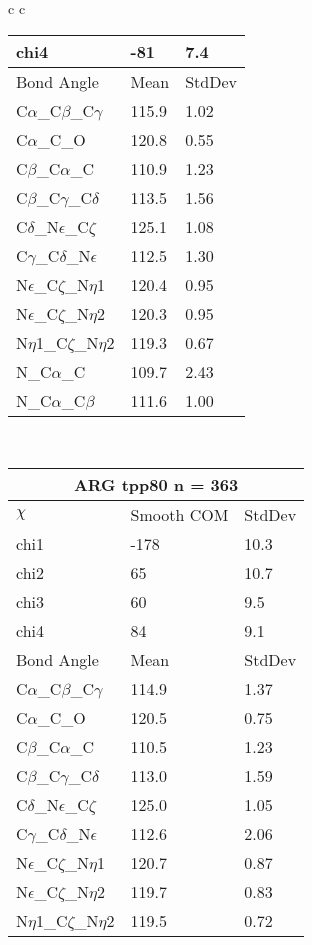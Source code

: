 \begin{longtable}{ c c }
\begin{tabular}{ l l l }
  chi4 & -81 & 7.4 \\ \midrule
  Bond Angle   & Mean     & StdDev \\ \midrule
  C$\alpha$\_C$\beta$\_C$\gamma$ & 115.9 & 1.02\\
  C$\alpha$\_C\_O & 120.8 & 0.55\\
  C$\beta$\_C$\alpha$\_C & 110.9 & 1.23\\
  C$\beta$\_C$\gamma$\_C$\delta$ & 113.5 & 1.56\\
  C$\delta$\_N$\epsilon$\_C$\zeta$ & 125.1 & 1.08\\
  C$\gamma$\_C$\delta$\_N$\epsilon$ & 112.5 & 1.30\\
  N$\epsilon$\_C$\zeta$\_N$\eta$1 & 120.4 & 0.95\\
  N$\epsilon$\_C$\zeta$\_N$\eta$2 & 120.3 & 0.95\\
  N$\eta$1\_C$\zeta$\_N$\eta$2 & 119.3 & 0.67\\
  N\_C$\alpha$\_C & 109.7 & 2.43\\
  N\_C$\alpha$\_C$\beta$ & 111.6 & 1.00\\
  \bottomrule
  \end{tabular}
  \\
  \begin{tabular}{ l l l }
  \toprule
  \multicolumn{3}{c}{ARG \textbf{tpp80} n = 363} \\ \toprule
  $\chi$       & Smooth COM & StdDev \\ \midrule
  chi1 & -178 & 10.3 \\ 
  chi2 & 65 & 10.7 \\ 
  chi3 & 60 & 9.5 \\ 
  chi4 & 84 & 9.1 \\ \midrule
  Bond Angle   & Mean     & StdDev \\ \midrule
  C$\alpha$\_C$\beta$\_C$\gamma$ & 114.9 & 1.37\\
  C$\alpha$\_C\_O & 120.5 & 0.75\\
  C$\beta$\_C$\alpha$\_C & 110.5 & 1.23\\
  C$\beta$\_C$\gamma$\_C$\delta$ & 113.0 & 1.59\\
  C$\delta$\_N$\epsilon$\_C$\zeta$ & 125.0 & 1.05\\
  C$\gamma$\_C$\delta$\_N$\epsilon$ & 112.6 & 2.06\\
  N$\epsilon$\_C$\zeta$\_N$\eta$1 & 120.7 & 0.87\\
  N$\epsilon$\_C$\zeta$\_N$\eta$2 & 119.7 & 0.83\\
  N$\eta$1\_C$\zeta$\_N$\eta$2 & 119.5 & 0.72\\

\end{tabular}
\end{longtable}
